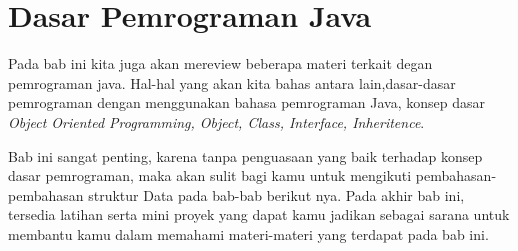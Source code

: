 \chapter{Dasar Pemrograman Java}
Pada bab ini kita juga akan mereview beberapa materi terkait degan pemrograman java. Hal-hal yang akan kita bahas antara lain,dasar-dasar pemrograman dengan menggunakan bahasa pemrograman Java, konsep dasar  \textit{Object Oriented Programming, Object, Class, Interface, Inheritence}.

Bab ini sangat penting, karena tanpa penguasaan yang baik terhadap konsep dasar pemrograman, maka akan sulit bagi kamu untuk mengikuti pembahasan-pembahasan struktur Data pada bab-bab berikut nya. Pada akhir bab ini, tersedia latihan serta mini proyek yang dapat kamu jadikan sebagai sarana untuk membantu kamu dalam memahami materi-materi yang terdapat pada bab ini.